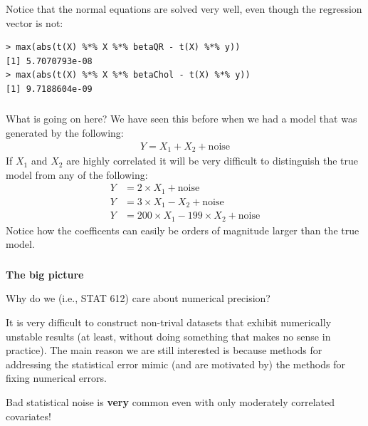 \begin{frame}[fragile] \frametitle{}

Notice that the normal equations are solved very well,
even though the regression vector is not:
\begin{verbatim}
> max(abs(t(X) %*% X %*% betaQR - t(X) %*% y))
[1] 5.7070793e-08
> max(abs(t(X) %*% X %*% betaChol - t(X) %*% y))
[1] 9.7188604e-09
\end{verbatim}

\end{frame}

\begin{frame}[fragile] \frametitle{}

What is going on here? We have seen this before when we had a model
that was generated by the following:
\begin{align*}
Y = X_1 + X_2 + \text{noise}
\end{align*}
\pause If $X_1$ and $X_2$ are highly correlated it will be very difficult
to distinguish the true model from any of the following:
\begin{align*}
Y &= 2 \times X_1 + \text{noise} \\
Y &= 3 \times X_1 - X_2 + \text{noise} \\
Y &= 200 \times X_1 - 199 \times X_2 + \text{noise}
\end{align*}
Notice how the coefficents can easily be orders of magnitude larger
than the true model.

\end{frame}

\begin{frame}[fragile] \frametitle{}

{\bf The big picture}

Why do we (i.e., STAT 612) care about numerical precision?

\pause It is very difficult to construct non-trival
datasets that exhibit numerically unstable results (at least,
without doing something that makes no sense in practice). \pause
The main reason we are still interested is because methods for
addressing the statistical error mimic (and are motivated by)
the methods for fixing numerical errors.

\pause Bad statistical noise is {\bf very} common even with
only moderately correlated covariates!

\end{frame}

